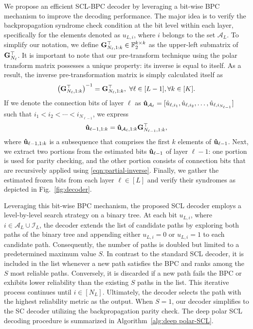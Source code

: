 \documentclass[conference]{IEEEtran}
\begin{document}
 
We propose an efficient SCL-BPC decoder by leveraging a bit-wise BPC mechanism to improve the decoding performance. The major idea is to verify the backpropagation syndrome check condition at the bit level within each layer, specifically for the elements denoted as $u_{L,i}$, where $i$ belongs to the set $\mathcal{A}_L$. To simplify our notation, we define ${\bf G}_{N_{\ell}, 1:k}^{\top} \in \mathbb{F}_2^{k\times k}$ as the upper-left submatrix of ${\bf G}_{N_{\ell}}^{\top}$. It is important to note that our pre-transform technique using the polar transform matrix possesses a unique property: its inverse is equal to itself. As a result, the inverse pre-transformation matrix is simply calculated itself as 
\begin{align}
    \left({\bf G}_{N_{\ell}, 1:k}^{\top}\right)^{-1} = {\bf G}_{N_{\ell}, 1:k}^{\top}, ~\forall \ell\in[L-1], \forall k\in[K].
\end{align}
If we denote the connection bits of layer $\ell$ as ${\bf \hat u}_{\mathcal{A}_{\ell}} = [{\hat u}_{\ell, i_{1}}, {\hat u}_{\ell, i_{2}}, \ldots, {\hat u}_{\ell, i_{N_{\ell-1}}}]$ such that $i_1 < i_2 < \cdots < i_{N_{\ell-1}}$, we express 
\begin{align}
    {\bf \hat u}_{\ell-1, 1:k} = {\bf \hat u}_{\mathcal{A}_{\ell}, 1:k} {\bf G}_{N_{\ell-1}, 1:k}^{\top}, \label{eqn:partial-inverse}
\end{align}
where ${\bf \hat u}_{\ell-1, 1:k}$ is a subsequence that comprises the first $k$ elements of ${\bf \hat u}_{\ell-1}$. Next, we extract two portions from the estimated bits ${\bf \hat u}_{\ell-1}$ of layer $\ell-1$: one portion is used for parity checking, and the other portion consists of connection bits that are recursively applied using  \eqref{eqn:partial-inverse}. Finally, we gather the estimated frozen bits from each layer $\ell \in [L]$ and verify their syndromes as depicted in Fig.~\ref{fig:decoder}.


Leveraging this bit-wise BPC mechanism, the proposed SCL decoder employs a level-by-level search strategy on a binary tree. At each bit $u_{L,i}$, where $i\in \mathcal{A}_L\cup \mathcal{I}_L$, the decoder extends the list of candidate paths by exploring both paths of the binary tree and appending either $u_{L,i}=0$ or $u_{L,i}=1$ to each candidate path. Consequently, the number of paths is doubled but limited to a predetermined maximum value $S$. In contrast to the standard SCL decoder, it is included in the list whenever a new path satisfies the BPC and ranks among the $S$ most reliable paths. Conversely, it is discarded if a new path fails the BPC or exhibits lower reliability than the existing $S$ paths in the list. This iterative process continues until $i\in [N_L]$. Ultimately, the decoder selects the path with the highest reliability metric as the output. When $S=1$, our decoder simplifies to the SC decoder utilizing the backpropagation parity check. The deep polar SCL decoding procedure is summarized in Algorithm~\ref{alg:deep polar-SCL}.
  
\end{document}
